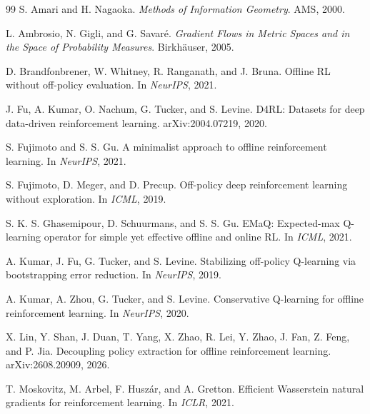 \begin{thebibliography}{99}
S. Amari and H. Nagaoka. \emph{Methods of Information Geometry}. AMS, 2000.

L. Ambrosio, N. Gigli, and G. Savar\'e. \emph{Gradient Flows in Metric Spaces and in the Space of Probability Measures}. Birkh\"auser, 2005.

D. Brandfonbrener, W. Whitney, R. Ranganath, and J. Bruna. Offline RL without off-policy evaluation. In \emph{NeurIPS}, 2021.

J. Fu, A. Kumar, O. Nachum, G. Tucker, and S. Levine. D4RL: Datasets for deep data-driven reinforcement learning. arXiv:2004.07219, 2020.

S. Fujimoto and S. S. Gu. A minimalist approach to offline reinforcement learning. In \emph{NeurIPS}, 2021.

S. Fujimoto, D. Meger, and D. Precup. Off-policy deep reinforcement learning without exploration. In \emph{ICML}, 2019.

S. K. S. Ghasemipour, D. Schuurmans, and S. S. Gu. EMaQ: Expected-max Q-learning operator for simple yet effective offline and online RL. In \emph{ICML}, 2021.

A. Kumar, J. Fu, G. Tucker, and S. Levine. Stabilizing off-policy Q-learning via bootstrapping error reduction. In \emph{NeurIPS}, 2019.

A. Kumar, A. Zhou, G. Tucker, and S. Levine. Conservative Q-learning for offline reinforcement learning. In \emph{NeurIPS}, 2020.

X. Lin, Y. Shan, J. Duan, T. Yang, X. Zhao, R. Lei, Y. Zhao, J. Fan, Z. Feng, and P. Jia. Decoupling policy extraction for offline reinforcement learning. arXiv:2608.20909, 2026.

T. Moskovitz, M. Arbel, F. Husz\'ar, and A. Gretton. Efficient Wasserstein natural gradients for reinforcement learning. In \emph{ICLR}, 2021.


\end{thebibliography}
